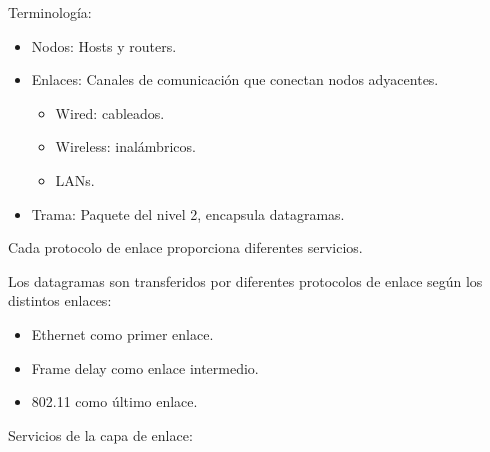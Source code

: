\documentclass[12pt, twoside, openright]{report} %
\begin{document}
Terminología:

\begin{itemize}
	\item Nodos: Hosts y routers.
	\item Enlaces: Canales de comunicación que conectan nodos adyacentes.

	      \begin{itemize}
		      \item Wired: cableados.
		      \item Wireless: inalámbricos.
		      \item LANs.
	      \end{itemize}
	\item Trama: Paquete del nivel 2, encapsula datagramas.
\end{itemize}

Cada protocolo de enlace proporciona diferentes servicios.

Los datagramas son transferidos por diferentes protocolos de enlace
según los distintos enlaces:

\begin{itemize}
	\item Ethernet como primer enlace.
	\item Frame delay como enlace intermedio.
	\item 802.11 como último enlace.
\end{itemize}

Servicios de la capa de enlace:
\end{document}
